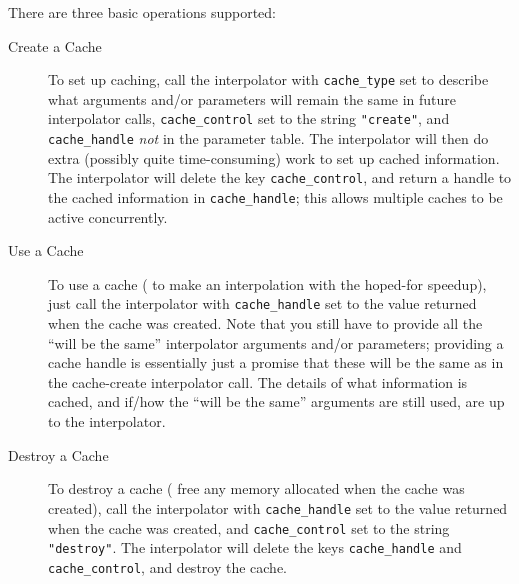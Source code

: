 There are three basic operations supported:
\begin{description}
\item[Create a Cache]
	To set up caching, call the interpolator with \verb|cache_type|
	set to describe what arguments and/or parameters will remain
	the same in future interpolator calls, \verb|cache_control|
	set to the string \verb|"create"|, and \verb|cache_handle|
	{\em not\/} in the parameter table.  The interpolator will
	then do extra (possibly quite time-consuming) work to set
	up cached information.  The interpolator will delete the
	key \verb|cache_control|, and return a handle to the cached
	information in \verb|cache_handle|; this allows multiple caches
	to be active concurrently.
\item[Use a Cache]
	To use a cache (\ie{} to make an interpolation with the
	hoped-for speedup), just call the interpolator with
	\verb|cache_handle| set to the value returned when the cache
	was created.  Note that you still have to provide all the
	``will be the same'' interpolator arguments and/or parameters;
	providing a cache handle is essentially just a promise that
	these will be the same as in the cache-create interpolator
	call.  The details of what information is cached, and if/how
	the ``will be the same'' arguments are still used, are up to
	the interpolator.
\item[Destroy a Cache]
	To destroy a cache (\ie{} free any memory allocated when
	the cache was created), call the interpolator with
	\verb|cache_handle| set to the value returned when the cache
	was created, and  \verb|cache_control| set to the string
	\verb|"destroy"|.  The interpolator will delete the keys
	\verb|cache_handle| and \verb|cache_control|, and destroy
	the cache.
\end{description}
